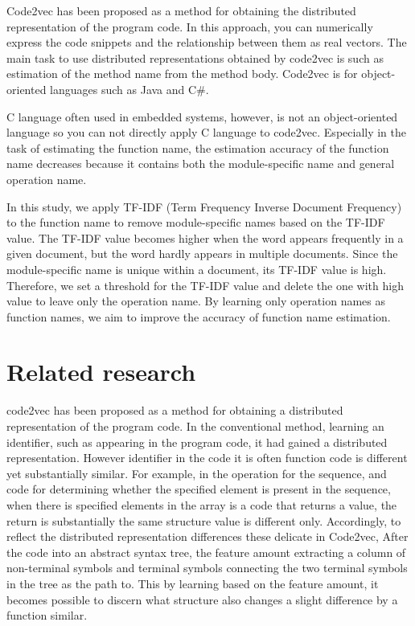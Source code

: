 \documentclass[JIP]{apris}
\begin{document}
Code2vec\cite{alon2019code2vec} has been proposed as a method for obtaining the distributed representation of the program code. In this approach, you can numerically express the code snippets and the relationship between them as real vectors. The main task to use distributed representations obtained by code2vec is such as estimation of the method name from the method body. Code2vec is for object-oriented languages such as Java and C\#.

C language often used in embedded systems, however, is not an object-oriented language so you can not directly apply C language to code2vec. Especially in the task of estimating the function name, the estimation accuracy of the function name decreases because it contains both the module-specific name and general operation name.

In this study, we apply TF-IDF (Term Frequency Inverse Document Frequency)\cite{ramos2003using} to the function name to remove module-specific names based on the TF-IDF value. The TF-IDF value becomes higher when the word appears frequently in a given document, but the word hardly appears in multiple documents. Since the module-specific name is unique within a document, its TF-IDF value is high. Therefore, we set a threshold for the TF-IDF value and delete the one with high value to leave only the operation name. By learning only operation names as function names, we aim to improve the accuracy of function name estimation.


\section{Related research}
code2vec has been proposed as a method for obtaining a distributed representation of the program code. In the conventional method, learning an identifier, such as appearing in the program code, it had gained a distributed representation. However identifier in the code it is often function code is different yet substantially similar. For example, in the operation for the sequence, and code for determining whether the specified element is present in the sequence, when there is specified elements in the array is a code that returns a value, the return is substantially the same structure value is different only. Accordingly, to reflect the distributed representation differences these delicate in Code2vec, After the code into an abstract syntax tree, the feature amount extracting a column of non-terminal symbols and terminal symbols connecting the two terminal symbols in the tree as the path to. This by learning based on the feature amount, it becomes possible to discern what structure also changes a slight difference by a function similar.
\end{document}

